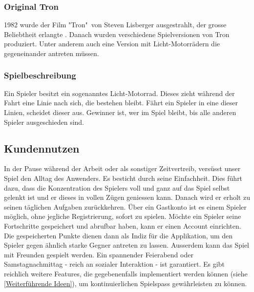 \documentclass[11pt,ngerman]{article}
\begin{document}
    \subsubsection{Original Tron}
    1982 wurde der Film "Tron"\ von Steven Lisberger ausgestrahlt, der grosse Beliebtheit erlangte \cite{lisbergerTRON1982}\cite{TronFilm2020}. Danach wurden verschiedene Spielversionen von Tron produziert. Unter anderem auch eine Version mit Licht-Motorrädern die gegeneinander antreten müssen.

    \subsubsection{Spielbeschreibung}
    Ein Spieler besitzt ein sogenanntes Licht-Motorrad. Dieses zieht während der Fahrt eine Linie nach sich, die bestehen bleibt. Fährt ein Spieler in eine dieser Linien, scheidet dieser aus. Gewinner ist, wer im Spiel bleibt, bis alle anderen Spieler ausgeschieden sind.

    \subsection{Kundennutzen}
    In der Pause während der Arbeit oder als sonstiger Zeitvertreib, versüsst unser Spiel den Alltag des Anwenders. Es besticht durch seine Einfachheit. Dies führt dazu, dass die Konzentration des Spielers voll und ganz auf das Spiel selbst gelenkt ist und er dieses in vollen Zügen geniessen kann. Danach wird er erholt zu seinen täglichen Aufgaben zurückkehren. Über ein Gastkonto ist es einem Spieler möglich, ohne jegliche Registrierung, sofort zu spielen. Möchte ein Spieler seine Fortschritte gespeichert und abrufbar haben, kann er einen Account einrichten. Die gespeicherten Punkte dienen dann als Indiz für die Applikation, um den Spieler gegen ähnlich starke Gegner antreten zu lassen. Ausserdem kann das Spiel mit Freunden gespielt werden. Ein spannender Feierabend oder Samstagnachmittag - reich an sozialer Interaktion - ist garantiert.
    Es gibt reichlich weitere Features, die gegebenenfalls implementiert werden können (siehe \ref{Weiterführende Ideen}), um kontinuierlichen Spielspass gewährleisten zu können.
\end{document}
